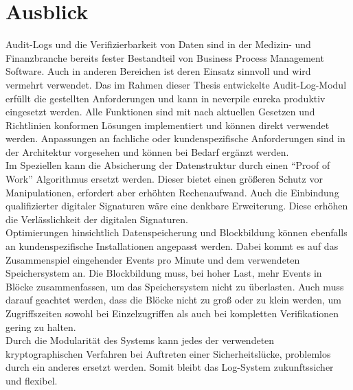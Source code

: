 \chapter{Ausblick}
Audit-Logs und die Verifizierbarkeit von Daten sind in der Medizin- und Finanzbranche bereits fester Bestandteil von Business Process Management Software. Auch in anderen Bereichen ist deren Einsatz sinnvoll und wird vermehrt verwendet.
Das im Rahmen dieser Thesis entwickelte Audit-Log-Modul erfüllt die gestellten Anforderungen und kann in neverpile eureka produktiv eingesetzt werden. Alle Funktionen sind mit nach aktuellen Gesetzen und Richtlinien konformen Lösungen implementiert und können direkt verwendet werden.
Anpassungen an fachliche oder kundenspezifische Anforderungen sind in der Architektur vorgesehen und können bei Bedarf ergänzt werden.\\
Im Speziellen kann die Absicherung der Datenstruktur durch einen "`Proof of Work"' Algorithmus ersetzt werden. Dieser bietet einen größeren Schutz vor Manipulationen, erfordert aber erhöhten Rechenaufwand. Auch die Einbindung qualifizierter digitaler Signaturen wäre eine denkbare Erweiterung. Diese erhöhen die Verlässlichkeit der digitalen Signaturen.\\
Optimierungen hinsichtlich Datenspeicherung und Blockbildung können ebenfalls an kundenspezifische Installationen angepasst werden. Dabei kommt es auf das Zusammenspiel eingehender Events pro Minute und dem verwendeten Speichersystem an. Die Blockbildung muss, bei hoher Last, mehr Events in Blöcke zusammenfassen, um das Speichersystem nicht zu überlasten. Auch muss darauf geachtet werden, dass die Blöcke nicht zu groß oder zu klein werden, um Zugriffszeiten sowohl bei Einzelzugriffen als auch bei kompletten Verifikationen gering zu halten.\\
Durch die Modularität des Systems kann jedes der verwendeten kryptographischen Verfahren bei Auftreten einer Sicherheitslücke, problemlos durch ein anderes ersetzt werden. Somit bleibt das Log-System zukunftssicher und flexibel.
